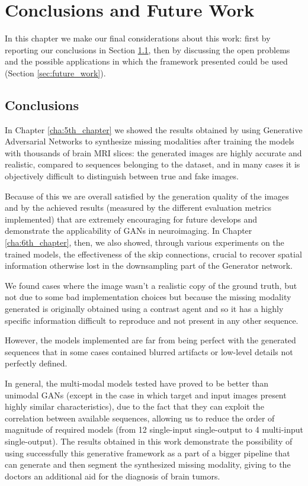 \chapter{Conclusions and Future Work}
\label{cha:7th_chapter}
In this chapter we make our final considerations about this work: first by reporting our conclusions in Section \ref{sec:conclusions}, then by discussing the open problems and the possible applications in which the framework presented could be used (Section \ref{sec:future_work}).

\section{Conclusions}
\label{sec:conclusions}


In Chapter \ref{cha:5th_chapter} we showed the results obtained by using Generative Adversarial Networks to synthesize missing modalities after training the models with thousands of brain MRI slices: the generated images are highly accurate and realistic, compared to sequences belonging to the dataset, and in many cases it is objectively difficult to distinguish between true and fake images.

Because of this we are overall satisfied by the generation quality of the images and by the achieved results (measured by the different evaluation metrics implemented) that are extremely encouraging for future develops and demonstrate the applicability of \ac{GAN}s in neuroimaging. 
In Chapter \ref{cha:6th_chapter}, then, we also showed, through various experiments on the trained models, the effectiveness of the skip connections, crucial to recover spatial information otherwise lost in the downsampling part of the Generator network.

We found cases where the image wasn't a realistic copy of the ground truth, but not due to some bad implementation choices but because the missing modality generated is originally obtained using a contrast agent and so it has a highly specific information difficult to reproduce and not present in any other sequence. 

However, the models implemented are far from being perfect with the generated sequences that in some cases contained blurred artifacts or low-level details not perfectly defined.

\vspace{5mm}
In general, the multi-modal models tested have proved to be better than unimodal \ac{GAN}s (except in the case in which target and input images present highly similar characteristics), due to the fact that they can exploit the correlation between available sequences, allowing us to reduce the order of magnitude of required models (from 12 single-input single-output to 4 multi-input single-output). The results obtained in this work demonstrate the possibility of using successfully this generative framework as a part of a bigger pipeline that can generate and then segment the synthesized missing modality, giving to the doctors an additional aid for the diagnosis of brain tumors.
